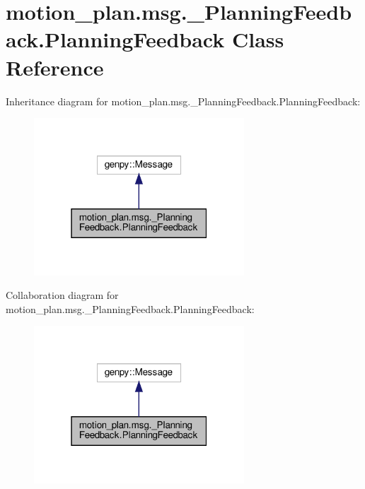 \hypertarget{classmotion__plan_1_1msg_1_1__PlanningFeedback_1_1PlanningFeedback}{}\section{motion\+\_\+plan.\+msg.\+\_\+\+Planning\+Feedback.\+Planning\+Feedback Class Reference}
\label{classmotion__plan_1_1msg_1_1__PlanningFeedback_1_1PlanningFeedback}


Inheritance diagram for motion\+\_\+plan.\+msg.\+\_\+\+Planning\+Feedback.\+Planning\+Feedback\+:
\nopagebreak
\begin{figure}[H]
\begin{center}
\leavevmode
\includegraphics[width=223pt]{classmotion__plan_1_1msg_1_1__PlanningFeedback_1_1PlanningFeedback__inherit__graph}
\end{center}
\end{figure}


Collaboration diagram for motion\+\_\+plan.\+msg.\+\_\+\+Planning\+Feedback.\+Planning\+Feedback\+:
\nopagebreak
\begin{figure}[H]
\begin{center}
\leavevmode
\includegraphics[width=223pt]{classmotion__plan_1_1msg_1_1__PlanningFeedback_1_1PlanningFeedback__coll__graph}
\end{center}
\end{figure}
